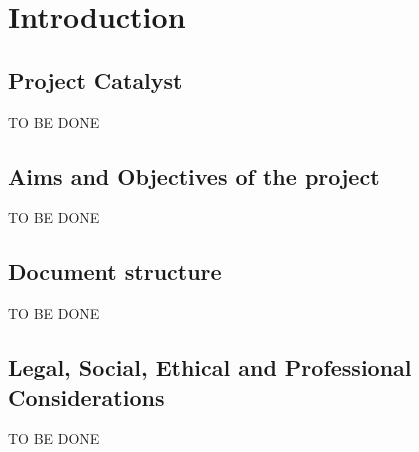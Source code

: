 \chapter{Introduction}
\label{Chapter:Introduction}

    \section{Project Catalyst}
    TO BE DONE
    
    \section{Aims and Objectives of the project}
    TO BE DONE
    
    \section{Document structure}
    TO BE DONE
    
    \section{Legal, Social, Ethical and Professional Considerations}
    TO BE DONE